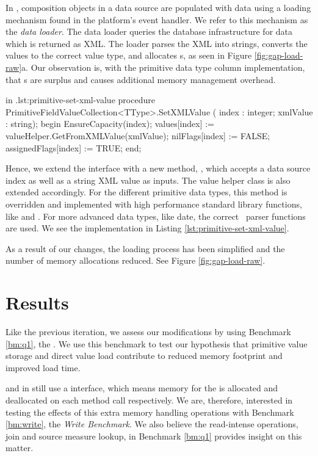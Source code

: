 In \gap, composition objects in a data source are populated with data using a loading mechanism found in the platform's event handler. We refer to this mechanism as the \textit{data loader}. The data loader queries the database infrastructure for data which is returned as XML. The loader parses the XML into strings, converts the values to the correct value type, and allocates s, as seen in Figure \ref{fig:gap-load-raw}a. Our observation is, with the primitive data type column implementation, that s are surplus and causes additional memory management overhead.

\begin{delphicode}{ in .}{lst:primitive-set-xml-value}
procedure PrimitiveFieldValueCollection<TType>.SetXMLValue
( index : integer; xmlValue : string);
begin
  EnsureCapacity(index);
  values[index] := valueHelper.GetFromXMLValue(xmlValue);
  nilFlags[index] := FALSE;
  assignedFlags[index] := TRUE;
end;
\end{delphicode}
Hence, we extend the  interface with a new method, , which accepts a data source index as well as a string XML value as inputs. The value helper class is also extended accordingly. For the different primitive data types, this method is overridden and implemented with high performance standard library functions, like  and . For more advanced data types, like date, the correct \gap~parser functions are used. We see the  implementation in Listing \ref{lst:primitive-set-xml-value}.

As a result of our changes, the loading process has been simplified and the number of memory allocations reduced. See Figure \ref{fig:gap-load-raw}.
\section{Results}
\label{sec:storage-format-test-results}
Like the previous iteration, we assess our modifications by using Benchmark \ref{bm:q1}, the \tpchdl. We use this benchmark to test our hypothesis that primitive value storage and direct value load contribute to reduced memory footprint and improved load time. 

 and  in  still use a  interface, which means memory for the  is allocated and deallocated on each method call respectively. We are, therefore, interested in testing the effects of this extra memory handling operations with Benchmark \ref{bm:write}, the \textit{Write Benchmark}. We also believe the read-intense operations, join and source measure lookup, in Benchmark \ref{bm:q1} provides insight on this matter.

